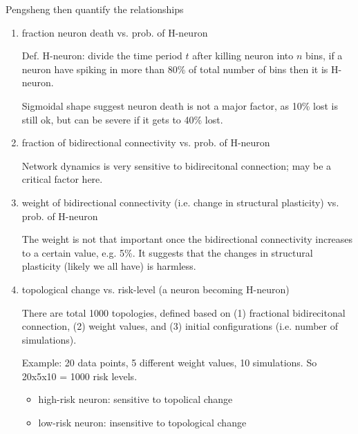 Pengsheng then quantify the relationships
\begin{enumerate}
  \item fraction neuron death vs. prob. of H-neuron

Def. H-neuron: divide the time period $t$ after killing neuron into $n$ bins, if
a neuron have spiking in more than 80\% of total number of bins then it is
H-neuron.
 
Sigmoidal shape suggest neuron death is not a major factor, as 10\% lost is
still ok, but can be severe if it gets to 40\% lost.

  \item fraction of bidirectional connectivity vs. prob. of H-neuron

Network dynamics is very sensitive to bidirecitonal connection; may be a
critical factor here.
  
  \item weight of bidirectional connectivity (i.e. change in structural
  plasticity) vs.   prob.   of H-neuron
  
The weight is not that important once the bidirectional connectivity increases
to a certain value, e.g. 5\%.  It suggests that the changes in structural
plasticity (likely we all have) is harmless.

  \item topological change vs. risk-level (a neuron becoming H-neuron)
  
There are total 1000 topologies, defined based on (1) fractional bidirecitonal
connection, (2) weight values, and (3) initial configurations (i.e. number of
simulations).

Example: 20 data points, 5 different weight values, 10 simulations. So  
20x5x10 = 1000 risk levels.
\begin{itemize}

  \item high-risk neuron: sensitive to topolical change
  
  \item low-risk neuron: insensitive to topological change
\end{itemize}

\end{enumerate}


